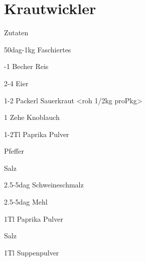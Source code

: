 \chapter*{Krautwickler}
\begin{multicols}{2}
 {\Large Zutaten}
 \begin{Zutaten}
		\item 50dag-1kg Faschiertes
		\item {}-1 Becher Reis
		\item 2-4 Eier
		\item 1-2 Packerl Sauerkraut <roh 1/2kg proPkg>
		\item 1 Zehe Knoblauch
		\item 1-2Tl Paprika Pulver
		\item Pfeffer
		\item Salz
		\item 2.5-5dag Schweineschmalz
		\item 2.5-5dag Mehl
		\item 1Tl Paprika Pulver
		\item Salz
		\item 1Tl Suppenpulver
		
		
		
		
		
		
\end{Zutaten}
	
\columnbreak
{}
\end{multicols}

